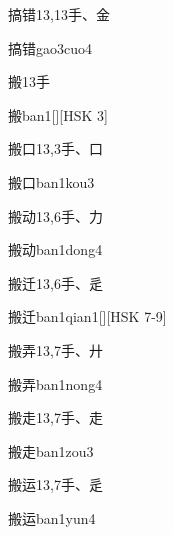 \begin{Entry}{搞错}{13,13}{⼿、⾦}
  \begin{Phonetics}{搞错}{gao3cuo4}
  \end{Phonetics}
\end{Entry}

\begin{Entry}{搬}{13}{⼿}
  \begin{Phonetics}{搬}{ban1}[][HSK 3]
  \end{Phonetics}
\end{Entry}

\begin{Entry}{搬口}{13,3}{⼿、⼝}
  \begin{Phonetics}{搬口}{ban1kou3}
  \end{Phonetics}
\end{Entry}

\begin{Entry}{搬动}{13,6}{⼿、⼒}
  \begin{Phonetics}{搬动}{ban1dong4}
  \end{Phonetics}
\end{Entry}

\begin{Entry}{搬迁}{13,6}{⼿、⾡}
  \begin{Phonetics}{搬迁}{ban1qian1}[][HSK 7-9]
  \end{Phonetics}
\end{Entry}

\begin{Entry}{搬弄}{13,7}{⼿、⼶}
  \begin{Phonetics}{搬弄}{ban1nong4}
  \end{Phonetics}
\end{Entry}

\begin{Entry}{搬走}{13,7}{⼿、⾛}
  \begin{Phonetics}{搬走}{ban1zou3}
  \end{Phonetics}
\end{Entry}

\begin{Entry}{搬运}{13,7}{⼿、⾡}
  \begin{Phonetics}{搬运}{ban1yun4}
  \end{Phonetics}
\end{Entry}

